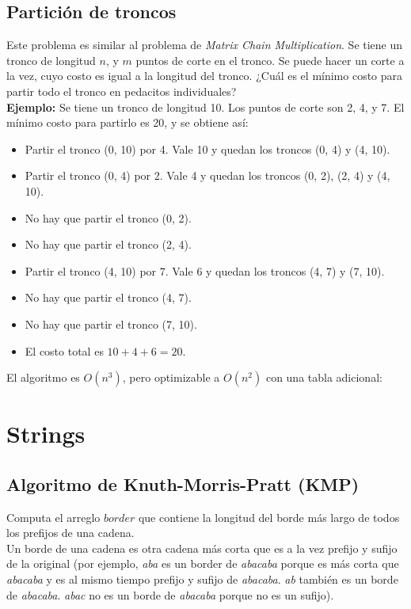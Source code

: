 \documentclass[10pt,letterpaper,twocolumn,twosided]{article}
\newcommand{\codigofuente}[1]{

\dotfill
}
\begin{document}
\subsection{Partición de troncos}
Este problema es similar al problema de \textit{Matrix Chain Multiplication}. Se tiene
un tronco de longitud $n$, y $m$ puntos de corte en el tronco. Se puede hacer un corte a la vez,
cuyo costo es igual a la longitud del tronco. ¿Cuál es el mínimo costo para partir todo el tronco
en pedacitos individuales?
\\
\medskip
\textbf{Ejemplo:} Se tiene un tronco de longitud 10. Los puntos de corte son 2, 4, y 7. El mínimo
costo para partirlo es 20, y se obtiene así:
\begin{itemize}
\item Partir el tronco (0, 10) por 4. Vale 10 y quedan los troncos (0, 4) y (4, 10).
\item Partir el tronco (0, 4) por 2. Vale 4 y quedan los troncos (0, 2), (2, 4) y (4, 10).
\item No hay que partir el tronco (0, 2).
\item No hay que partir el tronco (2, 4).
\item Partir el tronco (4, 10) por 7. Vale 6 y quedan los troncos (4, 7) y (7, 10).
\item No hay que partir el tronco (4, 7).
\item No hay que partir el tronco (7, 10).
\item El costo total es $10+4+6 = 20$.
\end{itemize}

\medskip
El algoritmo es $O(n^3)$, pero optimizable a $O(n^2)$ con una tabla adicional:
\codigofuente{./src/dp/particion_troncos.cpp}

\section{Strings}
\subsection{Algoritmo de Knuth-Morris-Pratt (KMP)}

Computa el arreglo $border$ que contiene la longitud del borde más largo de todos
los prefijos de una cadena. \\
Un borde de una cadena es otra cadena más corta que es a la vez prefijo y sufijo de la original
(por ejemplo, \textit{aba} es un border de \textit{abacaba} porque es más corta que \textit{abacaba}
y es al mismo tiempo prefijo y sufijo de \textit{abacaba}. \textit{ab} también es un borde de \textit{abacaba}.
\textit{abac} no es un borde de \textit{abacaba} porque no es un sufijo). \\
\end{document}
